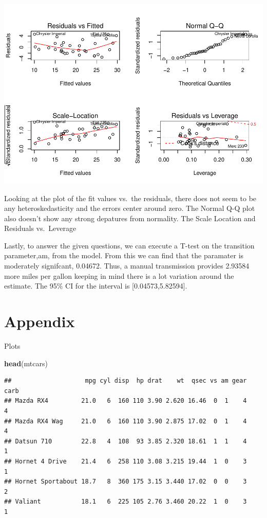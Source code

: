 \documentclass[]{article}
\newenvironment{Shaded}{\begin{snugshade}}{\end{snugshade}}
\newcommand{\KeywordTok}[1]{\textcolor[rgb]{0.13,0.29,0.53}{\textbf{{#1}}}}
\newcommand{\NormalTok}[1]{{#1}}
\begin{document}
\includegraphics{statproject_files/figure-latex/unnamed-chunk-6-1.pdf}

Looking at the plot of the fit values vs.~the residuals, there does not
seem to be any heteroskedasticity and the errors center around zero. The
Normal Q-Q plot also doesn't show any strong depatures from normality.
The Scale Location and Residuals vs.~Leverage

Lastly, to answer the given questions, we can execute a T-test on the
transition parameter,am, from the model. From this we can find that the
paramater is moderately signifcant, 0.04672. Thus, a manual transmission
provides 2.93584 more miles per gallon keeping in mind there is a lot
variation around the estimate. The 95\% CI for the interval is
{[}0.04573,5.82594{]}.

\section{Appendix}\label{appendix}

Plots

\begin{Shaded}
\begin{Highlighting}[]
\KeywordTok{head}\NormalTok{(mtcars)}
\end{Highlighting}
\end{Shaded}

\begin{verbatim}
##                    mpg cyl disp  hp drat    wt  qsec vs am gear carb
## Mazda RX4         21.0   6  160 110 3.90 2.620 16.46  0  1    4    4
## Mazda RX4 Wag     21.0   6  160 110 3.90 2.875 17.02  0  1    4    4
## Datsun 710        22.8   4  108  93 3.85 2.320 18.61  1  1    4    1
## Hornet 4 Drive    21.4   6  258 110 3.08 3.215 19.44  1  0    3    1
## Hornet Sportabout 18.7   8  360 175 3.15 3.440 17.02  0  0    3    2
## Valiant           18.1   6  225 105 2.76 3.460 20.22  1  0    3    1
\end{verbatim}
\end{document}
